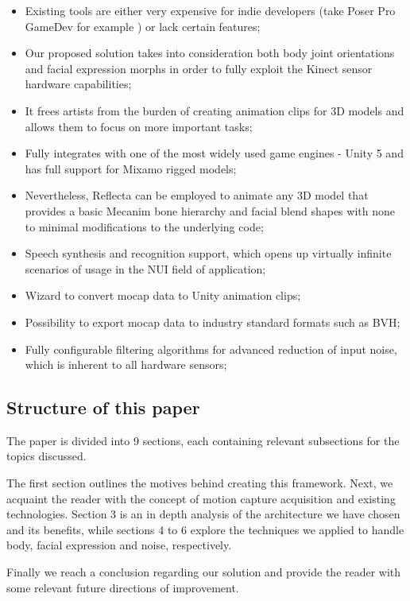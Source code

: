 \documentclass[a4paper, 12pt]{amsart}
\begin{document}
\begin{itemize}
\item Existing tools are either very expensive for indie developers (take Poser Pro GameDev for example \cite{bib_poser}) or lack certain features;
\item Our proposed solution takes into consideration both body joint orientations and facial expression morphs in order to fully exploit the Kinect sensor hardware capabilities;
\item It frees artists from the burden of creating animation clips for 3D models and allows them to focus on more important tasks;
\item Fully integrates with one of the most widely used game engines - Unity 5 and has full support for Mixamo rigged models;
\item Nevertheless, Reflecta can be employed to animate any 3D model that provides a basic Mecanim bone hierarchy and facial blend shapes with none to minimal modifications to the underlying code;
\item Speech synthesis and recognition support, which opens up virtually infinite scenarios of usage in the NUI field of application;
\item Wizard to convert mocap data to Unity animation clips;
\item Possibility to export mocap data to industry standard formats such as BVH;
\item Fully configurable filtering algorithms for advanced reduction of input noise, which is inherent to all hardware sensors;
\end{itemize}

\subsection{Structure of this paper}

The paper is divided into 9 sections, each containing relevant subsections for the topics discussed.

The first section outlines the motives behind creating this framework. Next, we acquaint the reader with the concept of motion capture acquisition and existing technologies. Section 3 is an in depth analysis of the architecture we have chosen and its benefits, while sections 4 to 6 explore the techniques we applied to handle body, facial expression and noise, respectively.

Finally we reach a conclusion regarding our solution and provide the reader with some relevant future directions of improvement.
\end{document}
